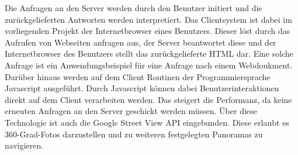Die Anfragen an den Server werden durch den Benutzer initiert und die zurückgelieferten Antworten werden interpretiert. Das Clientsystem ist dabei im vorliegenden Projekt der Internetbrowser eines Benutzers. Dieser löst durch das Aufrufen von Webseiten anfragen aus, der Server beantwortet diese und der Internetbrowser des Benutzers stellt das zurückgelieferte HTML dar. Eine solche Anfrage ist ein Anwendungsbeispiel für eine Anfrage nach einem Webdoukment. Darüber hinaus werden auf dem Client Routinen der Programmiersprache Javascript ausgeführt.
Durch Javascript können dabei Benutzerinteraktionen direkt auf dem Client verarbeiten werden. Das steigert die Performanz, da keine erneuten Anfragen an den Server geschickt werden müssen. Über diese Technologie ist auch die Google Street View API eingebunden. Diese erlaubt es 360-Grad-Fotos darzustellen und zu weiteren festgelegten Panoramas zu navigieren.